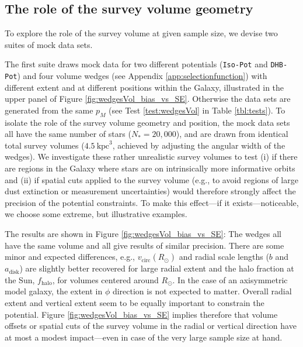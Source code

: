 \documentclass[iop,revtex4,numberedappendix,appendixfloats]{emulateapj}
\newcommand{\pmodel}{\ensuremath{p_M}}
\begin{document}

\subsection{The role of the survey volume geometry} \label{sec:results_obsvolume}

To explore the role of the survey volume at given sample size, we devise two suites of mock data sets.

The first suite draws mock data for two different potentials (\texttt{Iso-Pot} and \texttt{DHB-Pot}) and four volume wedges (see Appendix \ref{app:selectionfunction}) with different extent and at different positions within the Galaxy, illustrated in the upper panel of Figure \ref{fig:wedgesVol_bias_vs_SE}. Otherwise the data sets are generated from the same \pmodel{} (see Test \ref{test:wedgesVol} in Table \ref{tbl:tests}). To isolate the role of the survey volume geometry and position, the mock data sets all have the same number of stars ($N_{*} = 20,000$), and are drawn from identical total survey volumes ($4.5~\text{kpc}^3$, achieved by adjusting the angular width of the wedges).
We investigate these rather unrealistic survey volumes to test (i) if there are regions in the Galaxy where stars are on intrinsically more informative orbits and (ii) if spatial cuts applied to the survey volume (e.g., to avoid regions of large dust extinction or measurement uncertainties) would therefore strongly affect the precision of the potential constraints. To make this effect---if it exists---noticeable, we choose some extreme, but illustrative examples.

The results are shown in Figure \ref{fig:wedgesVol_bias_vs_SE}: The wedges all have the same volume and all give results of similar precision. There are some minor and expected differences, e.g., $v_\text{circ}(R_\odot)$ and radial scale lengths ($b$ and $a_\text{disk}$) are slightly better recovered for large radial extent and the halo fraction at the Sun, $f_\text{halo}$, for volumes centered around $R_\odot$. In the case of an axisymmetric model galaxy, the extent in $\phi$ direction is not expected to matter. Overall radial extent and vertical extent seem to be equally important to constrain the potential. Figure \ref{fig:wedgesVol_bias_vs_SE} implies therefore that volume offsets or spatial cuts of the survey volume in the radial or vertical direction have at most a modest impact---even in case of the very large sample size at hand.
\end{document}
